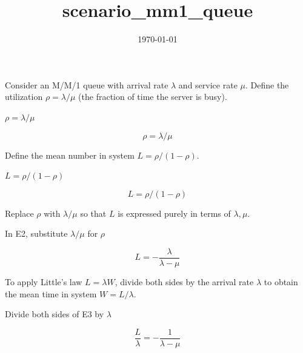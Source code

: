 \documentclass[dvipdfmx]{article}
\title{scenario\_mm1\_queue}
\date{\today}
\begin{document}
\maketitle

Consider an M/M/1 queue with arrival rate $\lambda$ and service rate $\mu$. Define the utilization $\rho=\lambda/\mu$ (the fraction of time the server is busy).

$\rho = \lambda/\mu$

\begin{equation}
  \rho = \lambda/\mu
  \label{eq:E1}
\end{equation}

Define the mean number in system $L=\rho/(1-\rho)$.

$L = \rho/(1-\rho)$

\begin{equation}
  L = \rho/(1-\rho)
  \label{eq:E2}
\end{equation}

Replace $\rho$ with $\lambda/\mu$ so that $L$ is expressed purely in terms of $\lambda,\mu$.

In E2, substitute $\lambda/\mu$ for $\rho$

\begin{equation}
  L = -\frac{\lambda}{\lambda-\mu}
  \label{eq:E3}
\end{equation}

To apply Little's law $L=\lambda W$, divide both sides by the arrival rate $\lambda$ to obtain the mean time in system $W=L/\lambda$.

Divide both sides of E3 by $\lambda$

\begin{equation}
  \frac{L}{\lambda} = -\frac{1}{\lambda-\mu}
  \label{eq:E4}
\end{equation}
\end{document}

